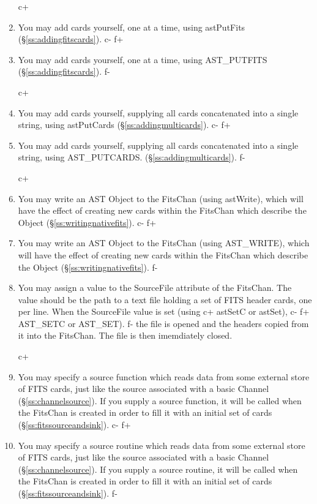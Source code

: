 \documentclass[twoside,11pt]{article}
\newcommand{\secref}[1]{\S\ref{#1}}
\newcommand{\secref}[1]{\ref{#1}}
\begin{document}
\begin{enumerate}
c+
\item You may add cards yourself, one at a time, using astPutFits
(\secref{ss:addingfitscards}).
c-
f+
\item You may add cards yourself, one at a time, using AST\_PUTFITS
(\secref{ss:addingfitscards}).
f-

c+
\item You may add cards yourself, supplying all cards concatenated into a
single string, using astPutCards
(\secref{ss:addingmulticards}).
c-
f+
\item You may add cards yourself, supplying all cards concatenated into a
single string, using AST\_PUTCARDS.
(\secref{ss:addingmulticards}).
f-

c+
\item You may write an AST Object to the FitsChan (using astWrite),
which will have the effect of creating new cards within the FitsChan
which describe the Object (\secref{ss:writingnativefits}).
c-
f+
\item You may write an AST Object to the FitsChan (using AST\_WRITE),
which will have the effect of creating new cards within the FitsChan
which describe the Object (\secref{ss:writingnativefits}).
f-

\item You may assign a value to the SourceFile attribute of the FitsChan.
The value should be the path to a text file holding a set of FITS header
cards, one per line. When the SourceFile value is set (using
c+
astSetC or astSet),
c-
f+
AST\_SETC or AST\_SET).
f-
the file is opened and the headers copied from it into the FitsChan.
The file is then imemdiately closed.

c+
\item You may specify a source function which reads data from some
external store of FITS cards, just like the source associated with a
basic Channel (\secref{ss:channelsource}). If you supply a source
function, it will be called when the FitsChan is created in order to
fill it with an initial set of cards (\secref{ss:fitssourceandsink}).
c-
f+
\item You may specify a source routine which reads data from some
external store of FITS cards, just like the source associated with a
basic Channel (\secref{ss:channelsource}). If you supply a source
routine, it will be called when the FitsChan is created in order to
fill it with an initial set of cards (\secref{ss:fitssourceandsink}).
f-
\end{enumerate}
\end{document}
